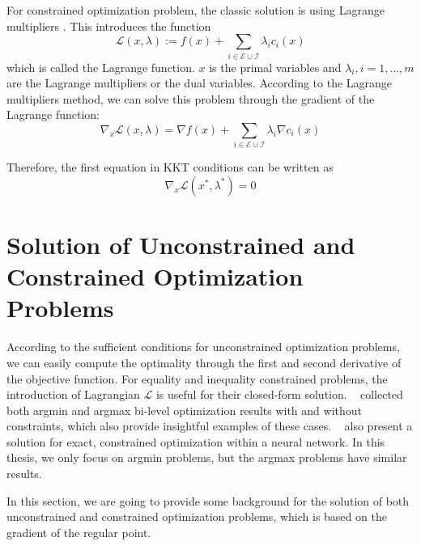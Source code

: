 \par For constrained optimization problem, the classic solution is using Lagrange multipliers \citep{BD:14}. This introduces the function 
$$
\mathscr{L}(x, \lambda):=f(x)+\sum_{i \in \mathscr{E} \cup \mathscr{I}} \lambda_{i} c_{i}(x)
$$
which is called the Lagrange function. $x$ is the primal variables and $\lambda_i, i=1, \dots, m$ are the Lagrange multipliers or the dual variables. According to the Lagrange multipliers method, we can solve this problem through the gradient of the Lagrange function: 
$$
\nabla_{x} \mathscr{L}(x, \lambda)=\nabla f(x)+\sum_{i \in \mathscr{E} \cup \mathscr{I}} \lambda_{i} \nabla c_{i}(x)
$$
\par Therefore, the first equation in KKT conditions can be written as
$$
\nabla_{x} \mathscr{L}\left(x^{*}, \lambda^{*}\right)=0
$$

\section{Solution of Unconstrained and Constrained Optimization Problems}
\label{sec:consopt}
According to the sufficient conditions for unconstrained optimization problems, we can easily compute the optimality through the first and second derivative of the objective function. For equality and inequality constrained problems, the introduction of Lagrangian $\mathcal{L}$ is useful for their closed-form solution. ~\cite{SG:16} collected both argmin and argmax bi-level optimization results with and without constraints, which also provide insightful examples of these cases. ~\cite{AB:17} also present a solution for exact, constrained optimization within a neural network. In this thesis, we only focus on argmin problems, but the argmax problems have similar results. 
\par In this section, we are going to provide some background for the solution of both unconstrained and constrained optimization problems, which is based on the gradient of the regular point. 
